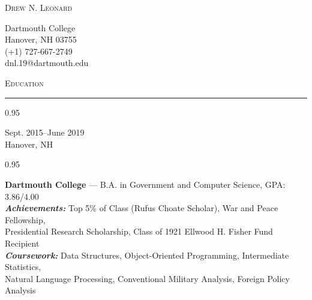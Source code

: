 \documentclass[a4paper,9pt]{article}
\newcommand{\mainMarginBottom}{\vspace*{1.5pt}}
\newcommand{\newLine}{\\}
\newcommand{\doubleColumnGap}{\hspace{4mm}}
\newcommand{\sectionMarginTopBottom}{\vspace*{7.5pt}}
\newcommand{\sectionMarginBetweenAdd}{\vspace{20pt}}
\newcommand{\mainLineSpacing}{0.95}
\newcommand{\titleMarginBelow}{\vspace*{2ex}}
\begin{document}
\begin{minipage}[b]{0.70\linewidth}
	{\fontsize{32}{38}\selectfont \textsc{Drew N. Leonard}}
\end{minipage}
\begin{minipage}[b]{0.25\linewidth}
	\begin{flushright}
		\begin{small}
			Dartmouth College
			\newLine{}
			\mainMarginBottom{}
			Hanover, NH 03755
			\newLine{}
			\mainMarginBottom{}
			(+1) 727-667-2749
			\newLine{}
			\mainMarginBottom{}
			dnl.19@dartmouth.edu
		\end{small}
	\end{flushright}
\end{minipage}

\titleMarginBelow{}
\sectionMarginBetweenAdd{}

\begin{Large}
	\textsc{Education}
\end{Large}
\sectionMarginTopBottom{}
\hrule
\sectionMarginTopBottom{}

\begin{minipage}[t]{0.20\linewidth}
	\begin{small}
		\begin{spacing}\mainLineSpacing{}
			\begin{flushright}
				Sept. 2015--June 2019
				\newLine{}
				\mainMarginBottom{}
				Hanover, NH
			\end{flushright}
		\end{spacing}
	\end{small}
\end{minipage}
\doubleColumnGap{}
\begin{minipage}[t]{0.75\linewidth}
	\begin{small}
		\begin{spacing}\mainLineSpacing{}
			\begin{flushleft}
				\textbf{Dartmouth College} --- B.A. in Government and Computer Science, GPA: 3.86/4.00
				\newLine{}
				\mainMarginBottom{}
				\textit{\textbf{Achievements:}} Top 5\% of Class (Rufus Choate Scholar), War and Peace Fellowship,\\ Presidential Research Scholarship, Class of 1921 Ellwood H. Fisher Fund Recipient  
				\newLine{}
				\mainMarginBottom{}
				\textit{\textbf{Coursework:}} Data Structures, Object-Oriented Programming, Intermediate Statistics,
                \\ Natural Language Processing, Conventional Military Analysis, Foreign Policy Analysis
			\end{flushleft}
		\end{spacing}
	\end{small}
\end{minipage}
\end{document}
